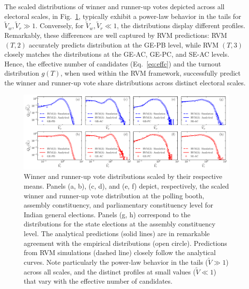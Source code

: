 The scaled distributions of winner and runner-up votes depicted across all electoral scales, in Fig.~\ref{fig:winner_runnerup_dist_india}, typically exhibit a power-law behavior in the tails for $\widetilde{V}_w, \widetilde{V}_r \gg 1$. Conversely, for $\widetilde{V}_w, \widetilde{V}_r \ll 1$, the distributions display different profiles. Remarkably, these differences are well captured by RVM predictions: RVM $(T, 2)$ accurately predicts distribution at the GE-PB level, while RVM $(T, 3)$ closely matches the distributions at the GE-AC, GE-PC, and SE-AC levels. Hence, the effective number of candidates (Eq.~\ref{eq:effc}) and the turnout distribution $g(T)$, when used within the RVM framework, successfully predict the winner and runner-up vote share distributions across distinct electoral scales.
\begin{figure}[H]
    \centering
    \includegraphics[width=\linewidth]{chapters/chapter6/winner_runnerup_dist_india.pdf}
    \caption{Winner and runner-up vote distributions scaled by their respective means. Panels (a, b), (c, d), and (e, f) depict, respectively, the scaled winner and runner-up vote distribution at the polling booth, assembly constituency, and parliamentary constituency level for Indian general elections. Panels (g, h) correspond to the distributions for the state elections at the assembly constituency level. The analytical predictions (solid lines) are in remarkable agreement with the empirical distributions (open circle). Predictions from RVM simulations (dashed line) closely follow the analytical curves. Note particularly the power-law behavior in the tails ($\widetilde{V} \gg 1$) across all scales, and the distinct profiles at small values ($\widetilde{V} \ll 1$) that vary with the effective number of candidates.}
    \label{fig:winner_runnerup_dist_india}
\end{figure}
